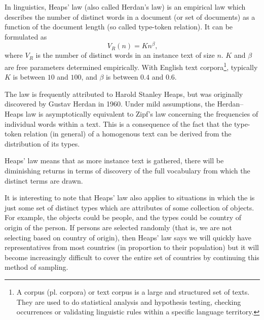    In linguistics, Heaps' law (also called Herdan's law) is an empirical law which describes the number of distinct words in a document (or set of documents) as a function of the document length (so called type-token relation). It can be formulated as
    \begin{equation}
      V_R(n) = Kn^\beta\mbox{,}
    \end{equation}
    where $V_R$ is the number of distinct words in an instance text of size $n$. $K$ and $\beta$ are free parameters determined empirically. With English text corpora\footnote{A corpus (pl. corpora) or text corpus is a large and structured set of texts. They are used to do statistical analysis and hypothesis testing, checking occurrences or validating linguistic rules within a specific language territory.}, typically $K$ is between $10$ and $100$, and $\beta$ is between $0.4$ and $0.6$.

    The law is frequently attributed to Harold Stanley Heaps, but was originally discovered by Gustav Herdan in 1960\cite{Egghe2007}. Under mild assumptions, the Herdan–Heaps law is asymptotically equivalent to Zipf's law concerning the frequencies of individual words within a text\cite{Kornai1999}. This is a consequence of the fact that the type-token relation (in general) of a homogenous text can be derived from the distribution of its types\cite{Milicka2009}.

    Heaps' law means that as more instance text is gathered, there will be diminishing returns in terms of discovery of the full vocabulary from which the distinct terms are drawn.

    It is interesting to note that Heaps' law also applies to situations in which the  is just some set of distinct types which are attributes of some collection of objects. For example, the objects could be people, and the types could be country of origin of the person. If persons are selected randomly (that is, we are not selecting based on country of origin), then Heaps' law says we will quickly have representatives from most countries (in proportion to their population) but it will become increasingly difficult to cover the entire set of countries by continuing this method of sampling.
